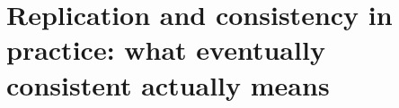 \chapter{Replication and consistency in practice: what eventually consistent actually means}
\label{ch:replication-and-consistency-in-practice}

